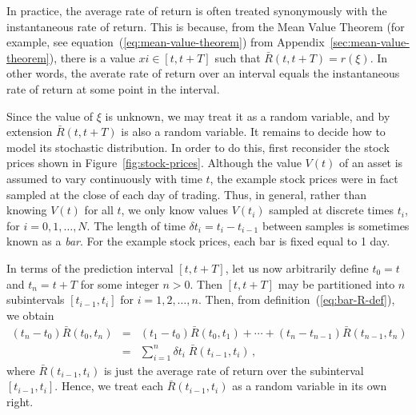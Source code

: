 \documentclass[a4paper]{book}
\begin{document}
In practice, the average rate of return
is often treated synonymously with the instantaneous
rate of return. This is because, 
from the Mean Value Theorem 
(for example, see equation~(\ref{eq:mean-value-theorem}) from Appendix~\ref{sec:mean-value-theorem}),
there is a value $xi\in[t,t+T]$ such that $\bar{R}(t,t+T)=r(\xi)$.
In other words, the averate rate of return over an interval equals the instantaneous rate of return at some point in the interval.

Since the value of $\xi$ is unknown, we may treat it as a random variable,
and by extension $\bar{R}(t,t+T)$ is also a random variable.
It remains to decide how to model
its stochastic distribution.
In order to do this, first reconsider
the stock prices shown in Figure~\ref{fig:stock-prices}.
Although the value $V(t)$ of an asset is assumed to vary continuously with time $t$, the example stock prices were in
fact sampled at the close of each day of trading.
Thus, in general, rather than knowing $V(t)$ for all $t$, we only know
values $V(t_i)$ sampled at discrete times $t_i$,
for $i=0,1,\ldots,N$. The length of time $\delta t_i=t_i-t_{i-1}$ 
between samples is sometimes known as a {\em bar}.
For the example stock prices, each bar is fixed equal to 1 day.

In terms of the prediction interval $[t,t+T]$, let us now arbitrarily
define $t_0=t$ and $t_n=t+T$ for some integer $n>0$.
Then $[t,t+T]$ may be partitioned into $n$ subintervals $[t_{i-1},t_i]$
for $i=1,2,\ldots,n$. Then, from definition~(\ref{eq:bar-R-def}),
we obtain
\begin{eqnarray}
(t_n-t_0)\bar{R}(t_0,t_n) & = & 
(t_1-t_0)\bar{R}(t_0,t_1)+\cdots
+(t_n-t_{n-1})\bar{R}(t_{n-1},t_n)\nonumber\\
& = & 
\sum_{i=1}^n \delta t_i\;\bar{R}(t_{i-1},t_i)\,,
\label{eq:R-bar-partition}
\end{eqnarray}
where $\bar{R}(t_{i-1},t_i)$ is just the average rate of return
over the subinterval $[t_{i-1},t_i]$. Hence,
we treat each $\bar{R}(t_{i-1},t_i)$ as a random variable
in its own right. 
\end{document}
